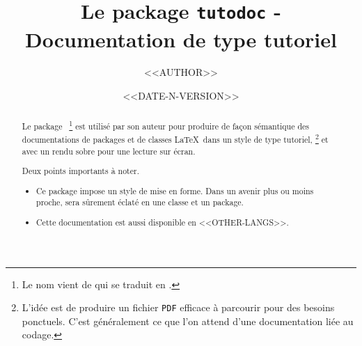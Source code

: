 \documentclass[12pt, a4paper]{article}
\begin{document}
\title{Le package \texttt{tutodoc} - Documentation de type tutoriel}
\author{<<AUTHOR>>}
\date{<<DATE-N-VERSION>>}

\maketitle

\begin{abstract}
    Le package \thispack{}\,%
    \footnote{
        Le nom vient de  qui se traduit en .
    }
    est utilisé par son auteur pour produire de façon sémantique des documentations de packages et de classes \LaTeX\ dans un style de type tutoriel,%
    \footnote{
        L'idée est de produire un fichier \texttt{PDF} efficace à parcourir pour des besoins ponctuels. C'est généralement ce que l'on attend d'une documentation liée au codage.
    }
    et avec un rendu sobre pour une lecture sur écran.

    \medskip

    \noindent
    Deux points importants à noter.
    \begin{itemize}
        \item Ce package impose un style de mise en forme. Dans un avenir plus ou moins proche, \thispack{} sera sûrement éclaté en une classe et un package.

        \item Cette documentation est aussi disponible en <<OTHER-LANGS>>.
    \end{itemize}
\end{abstract}
\end{document}
